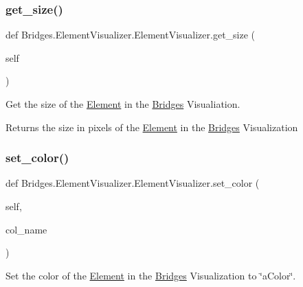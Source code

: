 \subsubsection{\texorpdfstring{get\+\_\+size()}{get\_size()}}
{\footnotesize\ttfamily def Bridges.\+Element\+Visualizer.\+Element\+Visualizer.\+get\+\_\+size (\begin{DoxyParamCaption}\item[{}]{self }\end{DoxyParamCaption})}



Get the size of the \mbox{\hyperlink{namespace_bridges_1_1_element}{Element}} in the \mbox{\hyperlink{namespace_bridges_1_1_bridges}{Bridges}} Visualiation. 

\begin{DoxyReturn}{Returns}
the size in pixels of the \mbox{\hyperlink{namespace_bridges_1_1_element}{Element}} in the \mbox{\hyperlink{namespace_bridges_1_1_bridges}{Bridges}} Visualization 
\end{DoxyReturn}
\mbox{\label{class_bridges_1_1_element_visualizer_1_1_element_visualizer_aceb8f72766f7656162d0942891fc8f09}} 
\subsubsection{\texorpdfstring{set\+\_\+color()}{set\_color()}}
{\footnotesize\ttfamily def Bridges.\+Element\+Visualizer.\+Element\+Visualizer.\+set\+\_\+color (\begin{DoxyParamCaption}\item[{}]{self,  }\item[{}]{col\+\_\+name }\end{DoxyParamCaption})}



Set the color of the \mbox{\hyperlink{namespace_bridges_1_1_element}{Element}} in the \mbox{\hyperlink{namespace_bridges_1_1_bridges}{Bridges}} Visualization to \char`\"{}a\+Color\char`\"{}. 


